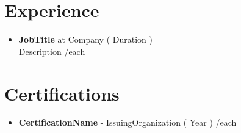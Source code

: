 \documentclass[a4paper,10pt]{article}
\begin{document}
\section*{Experience}
\begin{itemize}[leftmargin=*]
{{#each Experience}}
    \item \textbf{{ JobTitle }} at {{ Company }} ({{ Duration }}) \\
    {{ Description }}
{{/each}}
\end{itemize}

\section*{Certifications}
\begin{itemize}[leftmargin=*]
{{#each Certifications}}
    \item \textbf{{ CertificationName }} - {{ IssuingOrganization }} ({{ Year }})
{{/each}}
\end{itemize}
\end{document}
